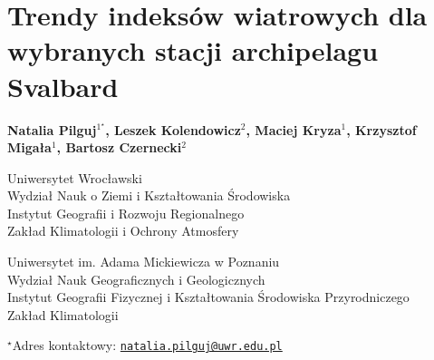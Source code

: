 \documentclass[\main/boa.tex]{subfiles}
\begin{document}
\section{Trendy indeksów wiatrowych dla wybranych stacji archipelagu Svalbard}

\begin{center}
  {\bf {} Natalia Pilguj$^{1^\star}$,  Leszek Kolendowicz$^{2}$,  Maciej Kryza$^{1}$,  Krzysztof Migała$^{1}$,  Bartosz Czernecki$^{2}$}
\end{center}

\vskip 0.3cm

\begin{affiliations}
\begin{enumerate}
\begin{minipage}{0.915\textwidth}
\centering
\item Uniwersytet Wrocławski\\ Wydział Nauk o Ziemi i Kształtowania Środowiska\\Instytut Geografii i Rozwoju Regionalnego\\Zakład Klimatologii i Ochrony Atmosfery\\[-2pt]
\item Uniwersytet im. Adama Mickiewicza w Poznaniu \\ Wydział Nauk Geograficznych i Geologicznych  \\ Instytut Geografii Fizycznej i Kształtowania Środowiska Przyrodniczego\\
Zakład Klimatologii \\[-2pt]
\end{minipage}
\end{enumerate}
$^\star$Adres kontaktowy: \href{mailto:natalia.pilguj@uwr.edu.pl}{\nolinkurl{natalia.pilguj@uwr.edu.pl}}\\
\end{affiliations}

\vskip 0.5cm


\vskip 0.5cm
\end{document}
